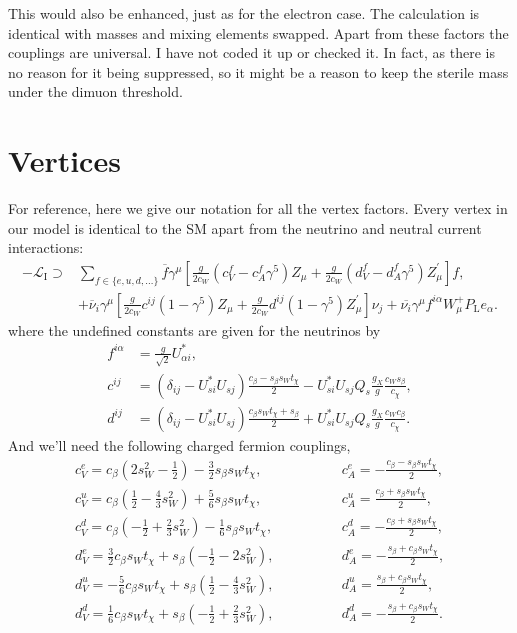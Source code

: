 \documentclass[11pt, a4paper]{article}
\begin{document}
This would also be enhanced, just as for the electron case. The calculation is
identical with masses and mixing elements swapped. Apart from these factors the
couplings are universal. I have not coded it up or checked it. In fact, as there is 
no reason for it being suppressed, so it might be a reason to keep the sterile
mass under the dimuon threshold.


\appendix
\newpage
\section{\label{app:vertices}Vertices}

For reference, here we give our notation for all the vertex factors. Every
vertex in our model is identical to the SM apart from the neutrino and neutral
current interactions:
%
\begin{align*}  
%
-\mathcal{L}_\text{I} \supset &\sum_{f\in\{e,u,d,\dots\}}
\overline{f}\gamma^\mu \left[
\frac{g}{2c_W}\left(c^f_V-c^f_A\gamma^5\right)Z_\mu  +
\frac{g}{2c_W}\left(d^f_V-d^f_A\gamma^5\right)Z^\prime_\mu \right]f, \\
%
&+\overline{\nu}_i\gamma^\mu \left[
\frac{g}{2c_W}c^{ij}\left(1-\gamma^5\right)Z_\mu  +
\frac{g}{2c_W}d^{ij}\left(1-\gamma^5\right)Z^\prime_\mu \right] \nu_j +
\overline{\nu_i}\gamma^\mu f^{i\alpha}W^+_\mu P_\text{L} e_\alpha. 
%
\end{align*}
%
where the undefined constants are given for the neutrinos by
%
\begin{align*}
%
f^{i\alpha} &= \frac{g}{\sqrt{2}}U^*_{\alpha i}, \\
%
c^{ij} &= \left(\delta_{ij} - U^*_{si}U_{sj}\right)\frac{c_\beta - s_\beta s_W
t_\chi}{2} - U^*_{si}U_{sj}Q_s \frac{g_X}{g}\frac{c_W s_\beta}{c_\chi}, \\
d^{ij} &= \left(\delta_{ij} - U^*_{si}U_{sj}\right)\frac{c_\beta s_W t_\chi +
s_\beta}{2} + U^*_{si}U_{sj}Q_s \frac{g_X}{g}\frac{c_W c_\beta}{c_\chi}.
\end{align*}
%
And we'll need the following charged fermion couplings,
%
\begin{align*} c^e_V = c_\beta \left(2s_W^2-\frac{1}{2}\right) -
\frac{3}{2}s_\beta s_W t_\chi, \qquad&\qquad c^e_A = -\frac{c_\beta - s_\beta
s_W t_\chi}{2}, \\
%
c^u_V = c_\beta \left(\frac{1}{2}-\frac{4}{3}s_W^2\right) + \frac{5}{6}s_\beta
s_W t_\chi,\qquad&\qquad c^u_A = \frac{c_\beta + s_\beta s_W t_\chi}{2}, \\
%
c^d_V = c_\beta \left(-\frac{1}{2}+\frac{2}{3}s_W^2\right) - \frac{1}{6}s_\beta
s_W t_\chi, \qquad&\qquad c^d_A = -\frac{c_\beta + s_\beta s_W t_\chi}{2}, \\
%
d^e_V = \frac{3}{2}c_\beta s_Wt_\chi + s_\beta\left(-\frac{1}{2} -
2s^2_W\right), \qquad&\qquad d^e_A = -\frac{s_\beta + c_\beta s_W t_\chi}{2},
\\
%
d^u_V = -\frac{5}{6}c_\beta s_Wt_\chi + s_\beta\left(\frac{1}{2} -
\frac{4}{3}s^2_W\right),\qquad&\qquad d^u_A = \frac{s_\beta + c_\beta s_W
t_\chi}{2}, \\
%
d^d_V = \frac{1}{6}c_\beta s_Wt_\chi + s_\beta\left(-\frac{1}{2} +
\frac{2}{3}s^2_W\right),\qquad & \qquad d^d_A = -\frac{s_\beta + c_\beta s_W
t_\chi}{2}.
%
\end{align*}
\end{document}
